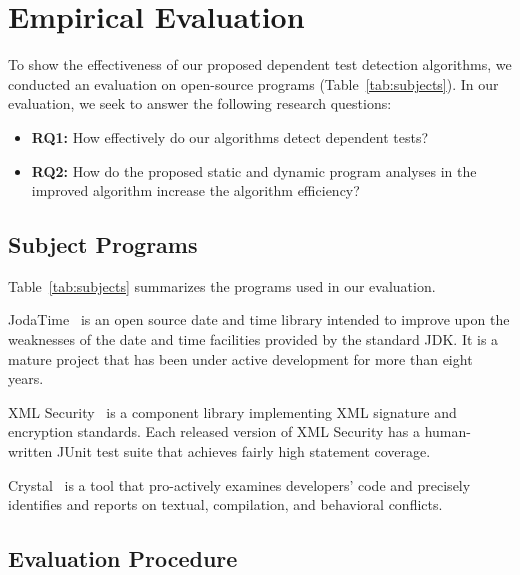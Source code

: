 \section{Empirical Evaluation}
\label{sec:evaluation}

To show the effectiveness of our proposed
dependent test detection algorithms, we conducted
an evaluation on  open-source programs (Table~\ref{tab:subjects}).
In our evaluation, we seek to answer the following research questions:

\begin{itemize}
\item \textbf{RQ1:} How effectively do our algorithms detect
dependent tests?
\item \textbf{RQ2:} How do the proposed static and dynamic program analyses
in the improved algorithm increase the algorithm efficiency?
\end{itemize}


\subsection{Subject Programs}




Table~\ref{tab:subjects} summarizes the programs used in our evaluation.

JodaTime~\cite{jodatime} is an open source
date and time library intended to improve upon the weaknesses of the
date and time facilities provided by the standard JDK.
It is a mature project that has been under active development
for more than eight years.

XML Security~\cite{xmlsecurity}
is a component library implementing XML signature and encryption
standards. Each released
version of XML Security has a human-written JUnit test suite that
achieves fairly high statement coverage.


Crystal~\cite{crystal} is a tool that
pro-actively examines developers' code and precisely identifies and reports on textual, compilation, and behavioral conflicts.



\subsection{Evaluation Procedure}


